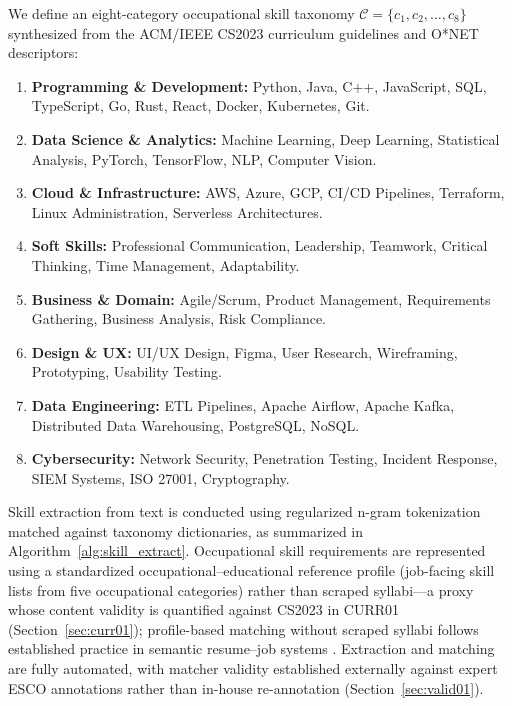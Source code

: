 \documentclass[journal]{IEEEtran}
\begin{document}
We define an eight-category occupational skill taxonomy $\mathcal{C} = \{c_1, c_2, \dots, c_8\}$ synthesized from the ACM/IEEE CS2023 curriculum guidelines and O*NET descriptors:
\begin{enumerate}
    \item \textbf{Programming \& Development:} Python, Java, C++, JavaScript, SQL, TypeScript, Go, Rust, React, Docker, Kubernetes, Git.
    \item \textbf{Data Science \& Analytics:} Machine Learning, Deep Learning, Statistical Analysis, PyTorch, TensorFlow, NLP, Computer Vision.
    \item \textbf{Cloud \& Infrastructure:} AWS, Azure, GCP, CI/CD Pipelines, Terraform, Linux Administration, Serverless Architectures.
    \item \textbf{Soft Skills:} Professional Communication, Leadership, Teamwork, Critical Thinking, Time Management, Adaptability.
    \item \textbf{Business \& Domain:} Agile/Scrum, Product Management, Requirements Gathering, Business Analysis, Risk Compliance.
    \item \textbf{Design \& UX:} UI/UX Design, Figma, User Research, Wireframing, Prototyping, Usability Testing.
    \item \textbf{Data Engineering:} ETL Pipelines, Apache Airflow, Apache Kafka, Distributed Data Warehousing, PostgreSQL, NoSQL.
    \item \textbf{Cybersecurity:} Network Security, Penetration Testing, Incident Response, SIEM Systems, ISO 27001, Cryptography.
\end{enumerate}

Skill extraction from text is conducted using regularized n-gram tokenization matched against taxonomy dictionaries, as summarized in Algorithm~\ref{alg:skill_extract}. Occupational skill requirements are represented using a standardized occupational--educational reference profile (job-facing skill lists from five occupational categories) rather than scraped syllabi---a proxy whose content validity is quantified against CS2023 in CURR01 (Section~\ref{sec:curr01}); profile-based matching without scraped syllabi follows established practice in semantic resume--job systems \cite{daberao2025resumeinsight}. Extraction and matching are fully automated, with matcher validity established externally against expert ESCO annotations rather than in-house re-annotation (Section~\ref{sec:valid01}).
\end{document}
